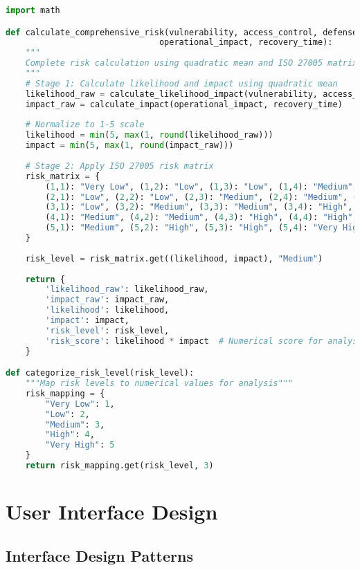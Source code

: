\documentclass[binding=0.6cm]{sapthesis}
\begin{document}
\begin{lstlisting}[language=Python, caption=Complete Risk Calculation Implementation]
import math

def calculate_comprehensive_risk(vulnerability, access_control, defense_capability, 
                               operational_impact, recovery_time):
    """
    Complete risk calculation using quadratic mean and ISO 27005 matrix
    """
    # Stage 1: Calculate likelihood and impact using quadratic mean
    likelihood_raw = calculate_likelihood_impact(vulnerability, access_control, defense_capability)
    impact_raw = calculate_impact(operational_impact, recovery_time)
    
    # Normalize to 1-5 scale
    likelihood = min(5, max(1, round(likelihood_raw)))
    impact = min(5, max(1, round(impact_raw)))
    
    # Stage 2: Apply ISO 27005 risk matrix
    risk_matrix = {
        (1,1): "Very Low", (1,2): "Low", (1,3): "Low", (1,4): "Medium", (1,5): "Medium",
        (2,1): "Low", (2,2): "Low", (2,3): "Medium", (2,4): "Medium", (2,5): "High",
        (3,1): "Low", (3,2): "Medium", (3,3): "Medium", (3,4): "High", (3,5): "High",
        (4,1): "Medium", (4,2): "Medium", (4,3): "High", (4,4): "High", (4,5): "Very High",
        (5,1): "Medium", (5,2): "High", (5,3): "High", (5,4): "Very High", (5,5): "Very High"
    }
    
    risk_level = risk_matrix.get((likelihood, impact), "Medium")
    
    return {
        'likelihood_raw': likelihood_raw,
        'impact_raw': impact_raw,
        'likelihood': likelihood,
        'impact': impact,
        'risk_level': risk_level,
        'risk_score': likelihood * impact  # Numerical score for analysis
    }

def categorize_risk_level(risk_level):
    """Map risk levels to numerical values for analysis"""
    risk_mapping = {
        "Very Low": 1,
        "Low": 2,
        "Medium": 3,
        "High": 4,
        "Very High": 5
    }
    return risk_mapping.get(risk_level, 3)
\end{lstlisting}

\section{User Interface Design}

\subsection{Interface Design Patterns}
\end{document}
